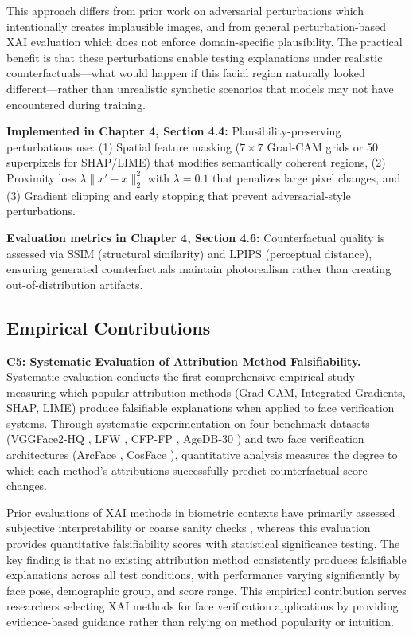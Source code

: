 This approach differs from prior work on adversarial perturbations \cite{dong2019efficient} which intentionally creates implausible images, and from general perturbation-based XAI evaluation \cite{hooker2019roar} which does not enforce domain-specific plausibility. The practical benefit is that these perturbations enable testing explanations under realistic counterfactuals---what would happen if this facial region naturally looked different---rather than unrealistic synthetic scenarios that models may not have encountered during training.

\vspace{0.3cm}
\noindent\textbf{Implemented in Chapter 4, Section 4.4:} Plausibility-preserving perturbations use: (1) Spatial feature masking ($7\times 7$ Grad-CAM grids or 50 superpixels for SHAP/LIME) that modifies semantically coherent regions, (2) Proximity loss $\lambda \|x' - x\|_2^2$ with $\lambda = 0.1$ that penalizes large pixel changes, and (3) Gradient clipping and early stopping that prevent adversarial-style perturbations.

\vspace{0.3cm}
\noindent\textbf{Evaluation metrics in Chapter 4, Section 4.6:} Counterfactual quality is assessed via SSIM (structural similarity) and LPIPS (perceptual distance), ensuring generated counterfactuals maintain photorealism rather than creating out-of-distribution artifacts.

\subsection{Empirical Contributions}

\textbf{C5: Systematic Evaluation of Attribution Method Falsifiability.} Systematic evaluation conducts the first comprehensive empirical study measuring which popular attribution methods (Grad-CAM, Integrated Gradients, SHAP, LIME) produce falsifiable explanations when applied to face verification systems. Through systematic experimentation on four benchmark datasets (VGGFace2-HQ \cite{cao2018vggface2}, LFW \cite{huang2007lfw}, CFP-FP \cite{sengupta2016cfp}, AgeDB-30 \cite{moschoglou2017agedb}) and two face verification architectures (ArcFace \cite{deng2019arcface}, CosFace \cite{wang2018cosface}), quantitative analysis measures the degree to which each method's attributions successfully predict counterfactual score changes.

Prior evaluations of XAI methods in biometric contexts have primarily assessed subjective interpretability or coarse sanity checks \cite{Adebayo2018_SanityChecks}, whereas this evaluation provides quantitative falsifiability scores with statistical significance testing. The key finding is that no existing attribution method consistently produces falsifiable explanations across all test conditions, with performance varying significantly by face pose, demographic group, and score range. This empirical contribution serves researchers selecting XAI methods for face verification applications by providing evidence-based guidance rather than relying on method popularity or intuition.


